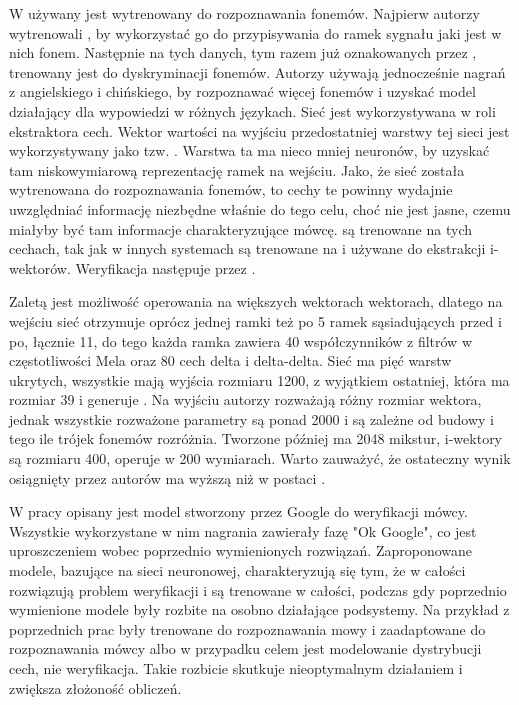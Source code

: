 W \cite{investigationOfBottleneck}
używany jest  wytrenowany do rozpoznawania fonemów. Najpierw autorzy wytrenowali , by wykorzystać go do przypisywania do ramek sygnału jaki
jest w nich fonem. Następnie na tych danych, tym razem już oznakowanych przez , trenowany jest  do dyskryminacji fonemów. Autorzy używają
jednocześnie nagrań z angielskiego i chińskiego, by rozpoznawać więcej fonemów i uzyskać model działający dla wypowiedzi w różnych językach.
Sieć jest wykorzystywana w roli ekstraktora cech. Wektor wartości na wyjściu przedostatniej warstwy tej sieci jest wykorzystywany jako tzw. . 
Warstwa ta ma nieco mniej neuronów, by uzyskać tam niskowymiarową reprezentację ramek na wejściu. Jako, że sieć została wytrenowana do rozpoznawania fonemów, to cechy te powinny
wydajnie uwzględniać informację niezbędne właśnie do tego celu, choć nie jest jasne, czemu miałyby być tam informacje charakteryzujące mówcę.
 są trenowane na tych cechach, tak jak w innych systemach są trenowane na  i używane do ekstrakcji i-wektorów. Weryfikacja następuje przez .

Zaletą  jest możliwość operowania na większych wektorach wektorach, dlatego na wejściu sieć otrzymuje oprócz jednej ramki też po 5 ramek sąsiadujących przed i po, łącznie 11,
do tego każda ramka zawiera 40 współczynników z filtrów w częstotliwości Mela oraz 80 cech delta i delta-delta. Sieć ma pięć warstw ukrytych, wszystkie mają wyjścia rozmiaru 1200, z wyjątkiem
ostatniej, która ma rozmiar 39 i generuje . Na wyjściu autorzy rozważają różny rozmiar wektora, jednak wszystkie rozważone parametry są ponad 2000 i są zależne
od budowy  i tego ile trójek fonemów rozróżnia. Tworzone później  ma 2048 mikstur, i-wektory są rozmiaru 400,  operuje w 200 wymiarach.
Warto zauważyć, że ostateczny wynik osiągnięty przez autorów ma wyższą  niż  w postaci .

W pracy \cite{endToEnd}
opisany jest model stworzony przez Google do weryfikacji mówcy. Wszystkie wykorzystane w nim nagrania zawierały fazę "Ok Google", co jest uproszczeniem wobec poprzednio wymienionych rozwiązań. 
Zaproponowane modele, bazujące na sieci neuronowej, charakteryzują się tym, że w całości rozwiązują problem weryfikacji
i są trenowane w całości, podczas gdy poprzednio wymienione modele były rozbite na osobno działające podsystemy.
Na przykład  z poprzednich prac były trenowane do rozpoznawania mowy i zaadaptowane do rozpoznawania mówcy albo w przypadku  celem jest modelowanie dystrybucji cech, nie weryfikacja. Takie rozbicie skutkuje nieoptymalnym działaniem i zwiększa złożoność obliczeń.

